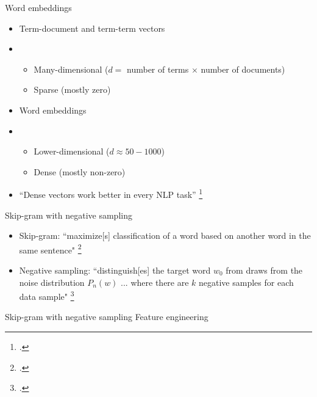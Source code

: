 \documentclass[10pt]{beamer}
\begin{document}
\begin{frame}
  {Word embeddings}
  \begin{itemize}
    \item Term-document and term-term vectors
    \item[]
          \begin{itemize}
            \item Many-dimensional ($d = $ number of terms $\times$ number of
                  documents)
            \item Sparse (mostly zero)
          \end{itemize}
    \item Word embeddings
    \item[]
          \begin{itemize}
            \item Lower-dimensional ($d \approx 50-1000$)
            \item Dense (mostly non-zero)
          \end{itemize}
    \item ``Dense vectors work better in every NLP task''
          \footcite[119]{Jurafsky2023}
  \end{itemize}
\end{frame}

\begin{frame}
  {Skip-gram with negative sampling}
  \begin{itemize}
    \item Skip-gram: ``maximize[s] classification of a word based on another
          word in the same sentence" \footcite[4]{Mikolov2013}
    \item Negative sampling: ``distinguish[es] the target word $w_0$ from draws
          from the noise distribution $P_n(w)$ ... where there are $k$ negative
          samples for each data sample" \footcite[4]{Mikolov2013a}
  \end{itemize}
\end{frame}

\begin{frame}
  {Skip-gram with negative sampling}
  {Feature engineering}
\end{frame}
\end{document}
